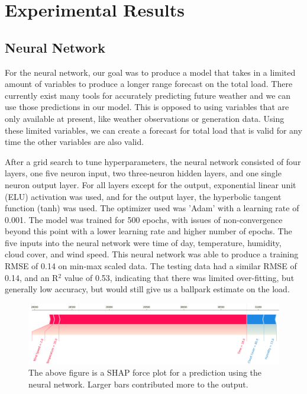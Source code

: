 \documentclass[10pt]{article}
\begin{document}
\section{Experimental Results}\label{sec:5}

\subsection{Neural Network}

For the neural network, our goal was to produce a model that takes in a limited amount of variables to produce a longer range forecast on the total load. There currently exist many tools for accurately predicting future weather and we can use those predictions in our model. This is opposed to using variables that are only available at present, like weather observations or generation data. Using these limited variables, we can create a forecast for total load that is valid for any time the other variables are also valid.

After a grid search to tune hyperparameters, the neural network consisted of four layers, one five neuron input, two three-neuron hidden layers, and one single neuron output layer. For all layers except for the output, exponential linear unit (ELU) activation was used, and for the output layer, the hyperbolic tangent function (tanh) was used. The optimizer used was 'Adam' with a learning rate of 0.001. The model was trained for 500 epochs, with issues of non-convergence beyond this point with a lower learning rate and higher number of epochs. The five inputs into the neural network were time of day, temperature, humidity, cloud cover, and wind speed. This neural network was able to produce a training RMSE of 0.14 on min-max scaled data. The testing data had a similar RMSE of 0.14, and an R$^2$ value of 0.53, indicating that there was limited over-fitting, but generally low accuracy, but would still give us a ballpark estimate on the load.

\begin{figure}[H]
    \centering
    \includegraphics[scale=0.39]{shap_nn.png}
    \caption {The above figure is a SHAP force plot for a prediction using the neural network. Larger bars contributed more to the output.}
    \label{shap_nn}
\end{figure}
\end{document}
